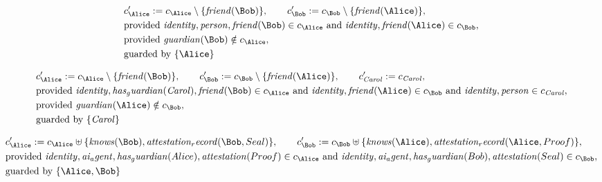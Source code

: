 \begin{align*}
&
c'_
{
\Alice
}
 := 
c_
{
\Alice
}
 \setminus 
\{
\mathit{
friend
}
(
\Bob
)
\}
, \qquad 
c'_
{
\Bob
}
 := 
c_
{
\Bob
}
 \setminus 
\{
\mathit{
friend
}
(
\Alice
)
\}
,\\
&
\text{provided } 
\mathit{
identity
}
,
\mathit{
person
}
,
\mathit{
friend
}
(
\Bob
)
 \in c_
{
\Alice
}
 \text{ and } 
\mathit{
identity
}
,
\mathit{
friend
}
(
\Alice
)
 \in c_
{
\Bob
}
,\\
&
\text{provided } 
\mathit{
guardian
}
(
\Bob
)
 \notin c_
{
\Alice
}
,\\
&
\text{guarded by } \{
\Alice
\}
\end{align*}

\begin{align*}
&
c'_
{
\Alice
}
 := 
c_
{
\Alice
}
 \setminus 
\{
\mathit{
friend
}
(
\Bob
)
\}
, \qquad 
c'_
{
\Bob
}
 := 
c_
{
\Bob
}
 \setminus 
\{
\mathit{
friend
}
(
\Alice
)
\}
, \qquad 
c'_
{
\mathit{Carol}
}
 := 
c_
{
\mathit{Carol}
}
,\\
&
\text{provided } 
\mathit{
identity
}
,
\mathit{
has_guardian
}
(
\mathit{Carol}
)
,
\mathit{
friend
}
(
\Bob
)
 \in c_
{
\Alice
}
 \text{ and } 
\mathit{
identity
}
,
\mathit{
friend
}
(
\Alice
)
 \in c_
{
\Bob
}
 \text{ and } 
\mathit{
identity
}
,
\mathit{
person
}
 \in c_
{
\mathit{Carol}
}
,\\
&
\text{provided } 
\mathit{
guardian
}
(
\Alice
)
 \notin c_
{
\Bob
}
,\\
&
\text{guarded by } \{
\mathit{Carol}
\}
\end{align*}

\begin{align*}
&
c'_
{
\Alice
}
 := 
c_
{
\Alice
}
 \uplus 
\{
\mathit{
knows
}
(
\Bob
)
,
\mathit{
attestation_record
}
(
\Bob
,
Seal
)
\}
, \qquad 
c'_
{
\Bob
}
 := 
c_
{
\Bob
}
 \uplus 
\{
\mathit{
knows
}
(
\Alice
)
,
\mathit{
attestation_record
}
(
\Alice
,
Proof
)
\}
,\\
&
\text{provided } 
\mathit{
identity
}
,
\mathit{
ai_agent
}
,
\mathit{
has_guardian
}
(
Alice
)
,
\mathit{
attestation
}
(
Proof
)
 \in c_
{
\Alice
}
 \text{ and } 
\mathit{
identity
}
,
\mathit{
ai_agent
}
,
\mathit{
has_guardian
}
(
Bob
)
,
\mathit{
attestation
}
(
Seal
)
 \in c_
{
\Bob
}
,\\
&
\text{guarded by } \{
\Alice
,
\Bob
\}
\end{align*}

